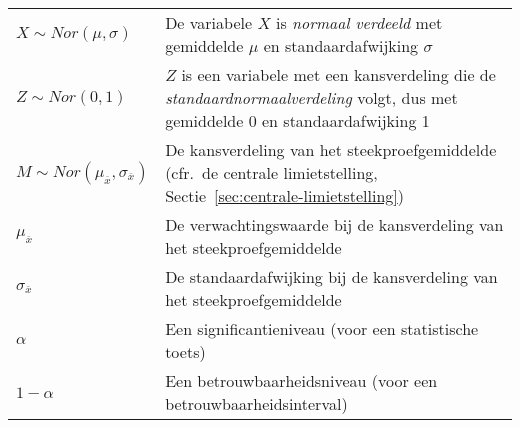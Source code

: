 \begin{table}
\begin{tabular}{p{}p{}}
  	$X \sim Nor(\mu, \sigma)$                               & De variabele $X$ is \emph{normaal verdeeld} met gemiddelde $\mu$ en standaardafwijking $\sigma$                                        \\
  	$Z \sim Nor(0, 1)$                                      & $Z$ is een variabele met een kansverdeling die de \emph{standaardnormaalverdeling} volgt, dus met gemiddelde 0 en standaardafwijking 1 \\
  	$M \sim Nor(\mu_{\overline{x}}, \sigma_{\overline{x}})$ & De kansverdeling van het steekproefgemiddelde (cfr.~de centrale limietstelling, Sectie~\ref{sec:centrale-limietstelling})              \\
  	$\mu_{\overline{x}}$                                    & De verwachtingswaarde bij de kansverdeling van het steekproefgemiddelde                                                                \\
  	$\sigma_{\overline{x}}$                                 & De standaardafwijking bij de kansverdeling van het steekproefgemiddelde                                                                \\
  	$\alpha$                                                & Een significantieniveau (voor een statistische toets)                                                                               \\
  	$1 - \alpha$                                            & Een betrouwbaarheidsniveau (voor een betrouwbaarheidsinterval)                                                                               \\ \bottomrule
  \end{tabular}
\end{table}
